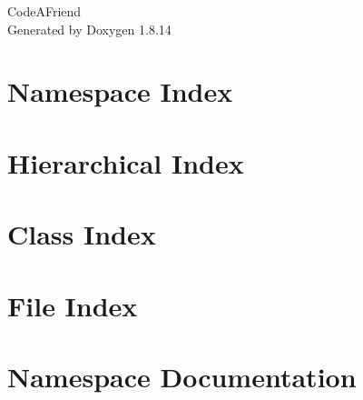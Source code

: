 \documentclass[twoside]{book}
\newcommand{\+}{\discretionary{\mbox{\scriptsize$\hookleftarrow$}}{}{}}
\newcommand{\clearemptydoublepage}{%
  \newpage{\pagestyle{empty}\cleardoublepage}%
}
\begin{document}
\hypersetup{pageanchor=false,
             bookmarksnumbered=true,
             pdfencoding=unicode
            }
\begin{titlepage}
\vspace*{7cm}
\begin{center}%
{\Large Code\+A\+Friend }\\
\vspace*{1cm}
{\large Generated by Doxygen 1.8.14}\\
\end{center}
\end{titlepage}
\clearemptydoublepage
{}
\tableofcontents
\clearemptydoublepage
{}
\hypersetup{pageanchor=true}

\chapter{Namespace Index}

\chapter{Hierarchical Index}

\chapter{Class Index}

\chapter{File Index}

\chapter{Namespace Documentation}















\end{document}
